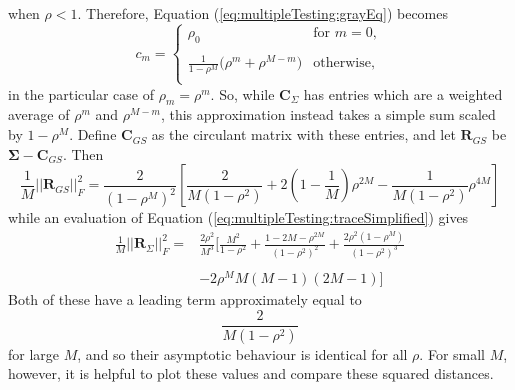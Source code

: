 \documentclass[letterpaper,12pt,oneside,final]{article}
\newcommand{\m}[1]{\mathbf{#1}}               %
\newcommand{\sm}[1]{\boldsymbol{#1}}   %
\newcommand{\norm}[1]{||{#1}||}              %
\newcommand{\frob}[1]{\norm{#1}_F}
\begin{document}
when $\rho < 1$. Therefore, Equation (\ref{eq:multipleTesting:grayEq}) becomes
\begin{equation} \label{eq:multipleTesting:grayApprox}
  c_m = \begin{cases}
    \rho_0 & \text{for } m = 0, \\
    & \\
    \frac{1}{1 - \rho^M} \big ( \rho^m + \rho^{M-m} \big )  & \text{otherwise},\\
  \end{cases}
\end{equation}
in the particular case of $\rho_m = \rho^m$. So, while $\m{C}_{\Sigma}$ has entries which are a weighted average of $\rho^m$ and $\rho^{M-m}$, this approximation instead takes a simple sum scaled by $1 - \rho^M$. Define $\m{C}_{GS}$ as the circulant matrix with these entries, and let $\m{R}_{GS}$ be $\sm{\Sigma} - \m{C}_{GS}$. Then
\begin{equation} \label{eq:multipleTesting:rateEqgren}
    \frac{1}{M} \frob{\m{R}_{GS}}^2 = \frac{2}{(1 - \rho^M)^2} \left [ \frac{2}{M(1 - \rho^2)} + 2 \left ( 1 - \frac{1}{M} \right ) \rho^{2M} - \frac{1}{M(1 - \rho^2)} \rho^{4M} \right ]
\end{equation}
while an evaluation of Equation (\ref{eq:multipleTesting:traceSimplified}) gives
\begin{equation} \label{eq:multipleTesting:rateEqCsig}
  \begin{aligned}
    \frac{1}{M} \frob{\m{R}_{\Sigma}}^2 = & \frac{2 \rho^2}{M^3} \bigg [ \frac{M^2}{1 - \rho^2} + \frac{1 - 2M - \rho^{2M}}{(1 - \rho^2)^2} + \frac{2 \rho^2 ( 1 - \rho^M )}{(1 - \rho^2)^3} \\
    & \\
    & - 2 \rho^M M(M-1)(2M-1) \bigg ]
  \end{aligned}
\end{equation}
Both of these have a leading term approximately equal to
$$ \frac{2}{M(1-\rho^2)}$$
for large $M$, and so their asymptotic behaviour is identical for all $\rho$. For small $M$, however, it is helpful to plot these values and compare these squared distances.



\cleardoublepage %

\renewcommand*{\bibname}{References} %

\end{document}
